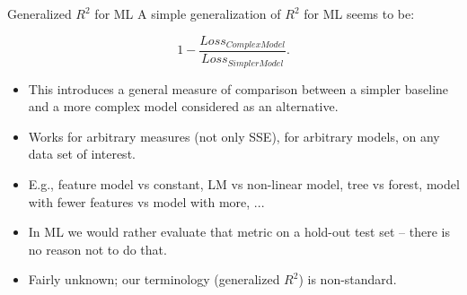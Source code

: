 
\begin{vbframe}{Generalized $R^2$ for ML}
A simple generalization of $R^2$ for ML seems to be:

\[
1 - \frac{Loss_{ComplexModel}}{Loss_{SimplerModel}}.
\]

\begin{itemize}
   \item This introduces a general measure of comparison between a simpler 
   baseline and a more complex model considered as an alternative.
  \item Works for arbitrary measures (not only SSE), for arbitrary models, on 
  any data set of interest.
  \item E.g., feature model vs constant, LM vs non-linear model, tree vs forest, 
  model with fewer features vs model with more, ...
  \item In ML we would rather evaluate that metric on a hold-out test set -- 
  there is no reason not to do that.
  \item Fairly unknown; our terminology (generalized $R^2$) is non-standard.
\end{itemize}

\end{vbframe}


